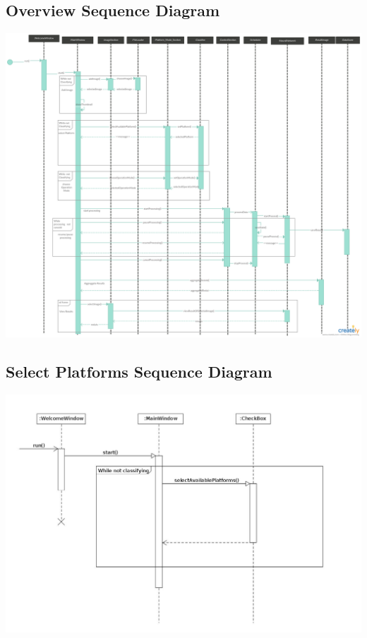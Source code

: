 \documentclass[parskip=full]{scrartcl}
\begin{document}
\begin{itemize}
\subsection {Overview Sequence Diagram}

\begin{center}
\includegraphics[width=1.0\textwidth]{seq.png}
\end{center}

\pagebreak

\subsection {Select Platforms Sequence Diagram}

\begin{center}
\includegraphics[width=1.0\textwidth]{SelectPlatforms.jpg}
\end{center}


\end{itemize}
\end{document}
